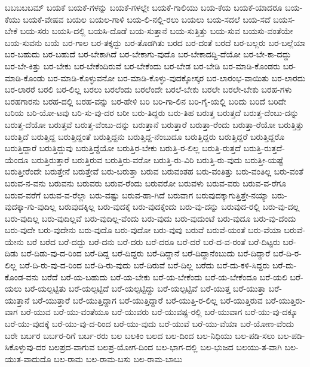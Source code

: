 {ಬಬಬಬಬಮ್
ಬಯಕೆ
ಬಯಕೆ-ಗಳನ್ನು
ಬಯಕೆ-ಗಳಲ್ಲೇ
ಬಯಕೆ-ಗಾಲಿಯು
ಬಯ-ಕೆಯ
ಬಯಕೆ-ಯಾದರೂ
ಬಯ-ಕೆಯು
ಬಯಕೆ-ವೇಷವ
ಬಯಲ
ಬಯಲ-ಗಾಳಿ
ಬಯ-ಲಿ-ನಲ್ಲಿ-ರಲು
ಬಯಲು
ಬಯ-ಸದಲೆ
ಬಯ-ಸದೆ
ಬಯಸ-ಬೇಕೆ
ಬಯ-ಸರು
ಬಯಸಿ-ದಲ್ಲಿ
ಬಯಸಿ-ದೊಡೆ
ಬಯ-ಸುತ್ತಾನೆ
ಬಯ-ಸುತ್ತಿತ್ತು
ಬಯ-ಸುವ
ಬಯಸು-ವಂತೆಯೇ
ಬಯ-ಸುವನು
ಬಯೆ
ಬರ-ಗಾಲ
ಬರ-ತಕ್ಕದ್ದು
ಬರ-ತೊಡಗಿತು
ಬರದ
ಬರ-ದಂತೆ
ಬರದೆ
ಬರ-ಬಲ್ಲರು
ಬರ-ಬಲ್ಲೆಯಾ
ಬರ-ಬಹುದು
ಬರ-ಬಹುದೆ
ಬರ-ಬೇಕಾಗಿದೆ
ಬರ-ಬೇಕಾಗು-ವುದೊ
ಬರ-ಬೇಕಾದದ್ದಿ-ದೆಯೋ
ಬರ-ಬೇ-ಕಾ-ದದ್ದು
ಬರ-ಬೇ-ಕಿತ್ತು
ಬರ-ಬೇಕು
ಬರ-ಬೇಕೆಂದಿರುವೆ
ಬರ-ಬೇಕೆಂದು
ಬರ-ಬೇಡ
ಬರ-ಬೇಡಿ
ಬರ-ಮಾಡಿ-ಕೊಂಡರು
ಬರ-ಮಾಡಿ-ಕೊಂಡು
ಬರ-ಮಾಡಿ-ಕೊಳ್ಳುವನೋ
ಬರ-ಮಾಡಿ-ಕೊಳ್ಳು-ವುದಕ್ಕೋಸ್ಕರ
ಬರ-ಲಾರಂಭ-ವಾಯಿತು
ಬರ-ಲಾರದು
ಬರ-ಲಾರರೆ
ಬರಲಿ
ಬರ-ಲಿಲ್ಲ
ಬರಲು
ಬರಲೆಂದು
ಬರಲೆಂದೇ
ಬರಲೆ-ಬೇಕು
ಬರಲೇ
ಬರಲೇ-ಬೇಕು
ಬರಹ-ಗಳು
ಬರಹಗಾರನು
ಬರಹ-ದಲ್ಲಿ
ಬರಹ-ವನ್ನು
ಬರ-ಹೇಳಿ
ಬರಿ
ಬರಿ-ಗಾ-ಲಿನ
ಬರಿ-ಗೈ-ಯಲ್ಲಿ
ಬರಿದು
ಬರಿದೆ
ಬರಿದೇ
ಬರಿಯ
ಬರಿ-ಯೋ-ಟವು
ಬರಿ-ಸು-ವು-ದರ
ಬರೀ
ಬರು-ತಿದ್ದರು
ಬರು-ತಿಹ
ಬರುತ್ತ
ಬರುತ್ತದೆ
ಬರುತ್ತ-ದೆಂಬು-ದನ್ನು
ಬರುತ್ತ-ದೆಯೋ
ಬರುತ್ತವೆ
ಬರುತ್ತ-ವೆಂಬು-ದನ್ನು
ಬರುತ್ತಾನೆ
ಬರುತ್ತಾರೆ
ಬರುತ್ತಾ-ರೆಂದು
ಬರುತ್ತಾ-ರೆಯೋ
ಬರುತ್ತಿತ್ತು
ಬರುತ್ತಿದೆ
ಬರುತ್ತಿದ್ದ
ಬರುತ್ತಿದ್ದಂತೆ
ಬರುತ್ತಿದ್ದನು
ಬರುತ್ತಿದ್ದ-ನೆಂಬುದೂ
ಬರುತ್ತಿದ್ದರು
ಬರುತ್ತಿದ್ದರೆ
ಬರುತ್ತಿದ್ದರೊ
ಬರುತ್ತಿದ್ದಾರೆ
ಬರುತ್ತಿದ್ದುವು
ಬರುತ್ತಿದ್ದೆಯೋ
ಬರುತ್ತಿರ-ಬೇಕು
ಬರುತ್ತಿ-ರ-ಲಿಲ್ಲ
ಬರುತ್ತಿ-ರುತ್ತದೆ
ಬರುತ್ತಿ-ರುತ್ತದೆ-ಯೆಂದೂ
ಬರುತ್ತಿರುತ್ತಾರೆ
ಬರುತ್ತಿರುವ
ಬರುತ್ತಿರು-ವರೋ
ಬರುತ್ತಿ-ರು-ವಿರಿ
ಬರುತ್ತಿ-ರು-ವುದು
ಬರುತ್ತೀ-ಯಷ್ಟೆ
ಬರುತ್ತೀರೆಂದೇ
ಬರುತ್ತೇನೆ
ಬರುತ್ತೇವೆ
ಬರು-ಬರುತ್ತಾ
ಬರುವ
ಬರುವಂತಹ
ಬರು-ವಂತಿತ್ತು
ಬರು-ವಂತಿಲ್ಲ
ಬರು-ವಂತೆ
ಬರುವ-ನ-ವನು
ಬರುವನು
ಬರುವರು
ಬರುವ-ರೆಂದು
ಬರುವರೋ
ಬರುವಳು
ಬರುವ-ವರು
ಬರುವ-ವ-ರೆಗೂ
ಬರುವ-ವರೆಗೆ
ಬರುವ-ವ-ರೆಲ್ಲಾ
ಬರು-ವಷ್ಟು
ಬರುವ-ಹಾ-ಗಿದೆ
ಬರುವಾಗ
ಬರುವುದಕ್ಕಾಗುತ್ತಿತ್ತೇ-ನಯ್ಯಾ
ಬರು-ವುದಕ್ಕಾ-ಗು-ವುದಿಲ್ಲ
ಬರುವುದಕ್ಕಿಲ್ಲ
ಬರು-ವುದಕ್ಕೆ
ಬರು-ವುದಕ್ಕೆಂದು
ಬರು-ವು-ದನ್ನು
ಬರುವುದ-ರಲ್ಲಿ
ಬರು-ವು-ದಲ್ಲ
ಬರು-ವುದಿಲ್ಲ
ಬರು-ವುದಿಲ್ಲವೆ
ಬರು-ವುದಿಲ್ಲ-ವೆಂದು
ಬರು-ವುದು
ಬರು-ವುದುಂಟೆ
ಬರು-ವುದೂ
ಬರು-ವು-ದೆಂದು
ಬರು-ವುದೇ
ಬರು-ವುದೇನು
ಬರು-ವುದೊ
ಬರು-ವುದೋ
ಬರು-ವುವು
ಬರುವೆ
ಬರುವೆ-ಯಂತೆ
ಬರು-ವೆಯಾ
ಬರುವೆ-ಯೇನು
ಬರೆ
ಬರೆದ
ಬರೆ-ದದ್ದು
ಬರೆ-ದನು
ಬರೆ-ದರು
ಬರೆ-ದರೂ
ಬರೆ-ದರೆ
ಬರೆ-ದ-ವ-ರಂತೆ
ಬರೆ-ದಿಟ್ಟರು
ಬರೆ-ದಿಡು
ಬರೆ-ದಿಡು-ವು-ದ-ರಿಂದ
ಬರೆ-ದಿದ್ದ
ಬರೆ-ದಿದ್ದರು
ಬರೆ-ದಿದ್ದಾನೆ
ಬರೆ-ದಿದ್ದಾನೆಂಬುದು
ಬರೆ-ದಿದ್ದಾರೆ
ಬರೆ-ದಿ-ರ-ಲಿಲ್ಲ
ಬರೆ-ದಿ-ರು-ವು-ದ-ರಿಂದ
ಬರೆ-ದಿ-ರು-ವುದು
ಬರೆ-ದಿರುವೆ
ಬರೆ-ದಿಲ್ಲ
ಬರೆದು
ಬರೆ-ದು-ಕಳಿ-ಸಿದ್ದರು
ಬರೆ-ದು-ಕೊಂಡ-ವನು
ಬರೆದೆ
ಬರೆ-ಯ-ಬಹುದು
ಬರೆ-ಯ-ಬೇಕು
ಬರೆ-ಯ-ಬೇಕೆಂದು
ಬರೆ-ಯ-ಬೇಕೆಂದೂ
ಬರೆ-ಯಲಿ
ಬರೆ-ಯಲು
ಬರೆ-ಯಲ್ಪಟ್ಟಿತು
ಬರೆ-ಯಲ್ಪಟ್ಟಿದೆ
ಬರೆ-ಯಲ್ಪಟ್ಟಿದ್ದು
ಬರೆ-ಯಲ್ಪಟ್ಟಿವೆ
ಬರೆ-ಯುತ್ತ
ಬರೆ-ಯುತ್ತಾ
ಬರೆ-ಯುತ್ತಾನೆ
ಬರೆ-ಯುತ್ತಾರೆ
ಬರೆ-ಯುತ್ತಿದ್ದಾಗ
ಬರೆ-ಯುತ್ತಿದ್ದಾರೆ
ಬರೆ-ಯುತ್ತಿ-ರ-ಲಿಲ್ಲ
ಬರೆ-ಯುತ್ತಿರುವ
ಬರೆ-ಯುತ್ತಿರು-ವಾಗ
ಬರೆ-ಯುವ
ಬರೆ-ಯು-ವಂತೆಯೂ
ಬರೆ-ಯುವರು
ಬರೆ-ಯುವಷ್ಟ-ರಲ್ಲಿ
ಬರೆ-ಯುವಾಗ
ಬರೆ-ಯು-ವು-ದಕ್ಕೂ
ಬರೆ-ಯು-ವುದಕ್ಕೆ
ಬರೆ-ಯು-ವು-ದ-ರಿಂದ
ಬರೆ-ಯು-ವುದು
ಬರೆ-ಯುವೆ
ಬರೆ-ಯು-ವೆಯಾ
ಬರೆ-ಯೋಣ-ವೆಂದು
ಬರೇ
ಬರ್ಬರ
ಬರ್ಬರ-ರಿಗೆ
ಬರ್ಬ-ರರು
ಬಲ
ಬಲಕಿಂ
ಬಲದ
ಬಲ-ದಿಂದ
ಬಲ-ನಿಧಿಯು
ಬಲ-ಪಡಿ-ಸಲು
ಬಲ-ಪಡಿ-ಸಿಕೊಳ್ಳುವು-ದರ
ಬಲಪ್ರದ-ವಾಗುವ
ಬಲಪ್ರ-ಯೋಗ-ದಿಂದ
ಬಲ-ಭಾಗ-ದಲ್ಲಿ
ಬಲ-ಭುಜದ
ಬಲಯು-ತ-ವಾಗಿ
ಬಲ-ಯುತ-ವಾದುದೊ
ಬಲ-ರಾಮ
ಬಲ-ರಾಮ-ಬಸು
ಬಲ-ರಾಮ-ಬಾಬು
}
